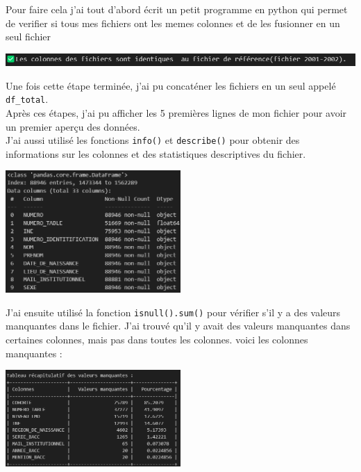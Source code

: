 Pour faire cela j'ai tout d'abord écrit un petit programme en python qui permet de verifier si tous mes fichiers ont les memes colonnes et de les fusionner en un seul fichier
\begin{center}
    \includegraphics[width=1\textwidth]{image/1.png} 
\end{center} 

Une fois cette étape terminée, j'ai pu concaténer les fichiers en un seul appelé \texttt{df\_total}.\\
Après ces étapes, j'ai pu afficher les 5 premières lignes de mon fichier pour avoir un premier aperçu des données.\\
J'ai aussi utilisé les fonctions \texttt{info()} et \texttt{describe()} pour obtenir des informations sur les colonnes et des statistiques descriptives du fichier.
\begin{center}
    \includegraphics[width=0.5\textwidth]{image/2.png} 
\end{center}  

J'ai ensuite utilisé la fonction \texttt{isnull().sum()} pour vérifier s'il y a des valeurs manquantes dans le fichier. J'ai trouvé qu'il y avait des valeurs manquantes dans certaines colonnes, mais pas dans toutes les colonnes. voici les colonnes manquantes :
\begin{center}
    \includegraphics[width=0.5\textwidth]{image/3.png} 
\end{center}  


